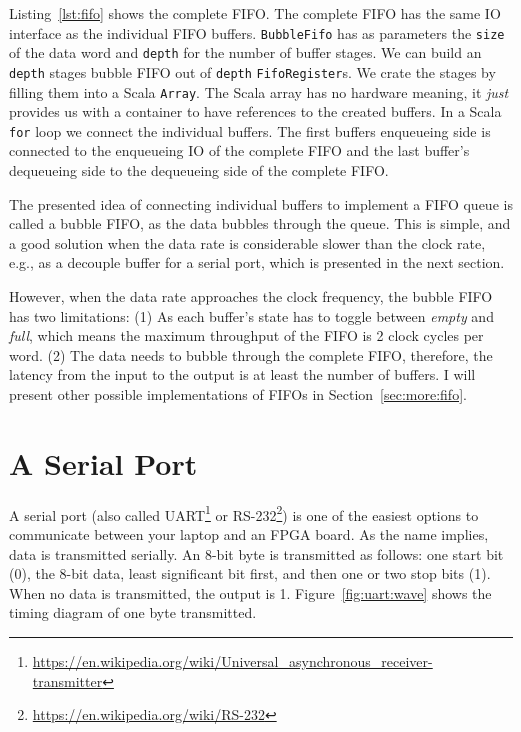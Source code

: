 \documentclass[%
    10pt,
    headinclude, footexclude,
    openright, %
    notitlepage,
    cleardoubleempty,
    headsepline,
    pointlessnumbers,
    bibtotoc, idxtotoc,
    ]{scrbook}
\newcommand{\code}[1]{{\small{\texttt{#1}}}}
\newcommand{\myref}[2]{\href{#1}{#2}}
\renewcommand{\myref}[2]{{#2}{\footnote{\url{#1}}}}
\begin{document}

Listing~\ref{lst:fifo} shows the complete FIFO. The complete FIFO has
the same IO interface as the individual FIFO buffers.
\code{BubbleFifo} has as parameters the \code{size} of the data
word and \code{depth} for the number of buffer stages.
We can build an \code{depth} stages bubble FIFO out of \code{depth}
\code{FifoRegister}s. We crate the stages by filling them into a Scala \code{Array}.
The Scala array has no hardware meaning, it \emph{just} provides us with
a container to have references to the created buffers.
In a Scala \code{for} loop we connect the individual buffers.
The first buffers enqueueing side is connected to the enqueueing IO of
the complete FIFO and the last buffer's dequeueing side to the
dequeueing side of the complete FIFO.


The presented idea of connecting individual buffers to implement a FIFO
queue is called a bubble FIFO, as the data bubbles through the queue.
This is simple, and a good solution when the data rate is considerable slower
than the clock rate, e.g., as a decouple buffer for a serial port, which is presented
in the next section.

However, when the data rate approaches the clock frequency, the bubble FIFO
has two limitations: (1) As each buffer's state has to toggle between \emph{empty} and
\emph{full}, which means the maximum throughput of the FIFO is 2 clock cycles
per word. (2) The data needs to bubble through the complete FIFO, therefore,
the latency from the input to the output is at least the number of buffers.
I will present other possible implementations of FIFOs in Section~\ref{sec:more:fifo}.

\section{A Serial Port}

A serial port (also called
\myref{https://en.wikipedia.org/wiki/Universal_asynchronous_receiver-transmitter}{UART}
or \myref{https://en.wikipedia.org/wiki/RS-232}{RS-232}) is one of the easiest options
to communicate between your laptop and an FPGA board.
As the name implies, data is transmitted serially. An 8-bit byte is transmitted as follows:
one start bit (0), the 8-bit data, least significant bit first, and then one or two stop
bits (1). When no data is transmitted, the output is 1.
Figure~\ref{fig:uart:wave} shows the timing diagram of one byte transmitted.
\end{document}
